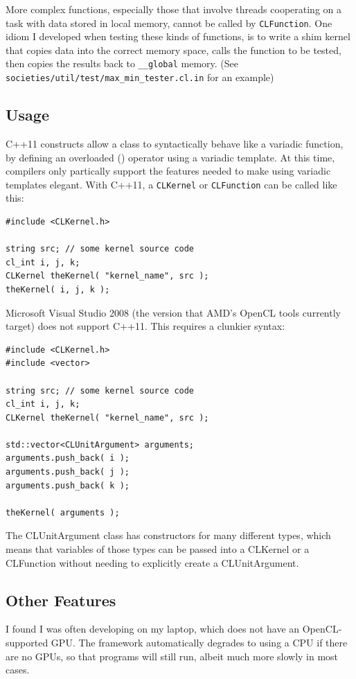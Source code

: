 \documentclass{article}
\begin{document}
More complex functions, especially those that involve threads cooperating on a task with data stored in local memory, cannot be called by \texttt{CLFunction}. One idiom I developed when testing these kinds of functions, is to write a shim kernel that copies data into the correct memory space, calls the function to be tested, then copies the results back to \texttt{\_\_global} memory. (See \texttt{societies/util/test/max\_min\_tester.cl.in} for an example)

\subsection{Usage}
C++11 constructs allow a class to syntactically behave like a variadic function, by defining an overloaded () operator using a variadic template. At this time, compilers only partically support the features needed to make using variadic templates elegant. With C++11, a \texttt{CLKernel} or \texttt{CLFunction} can be called like this:

\begin{lstlisting}
#include <CLKernel.h>

string src; // some kernel source code
cl_int i, j, k;
CLKernel theKernel( "kernel_name", src );
theKernel( i, j, k );
\end{lstlisting}

Microsoft Visual Studio 2008 (the version that AMD's OpenCL tools currently target) does not support C++11. This requires a clunkier syntax:

\begin{lstlisting}
#include <CLKernel.h>
#include <vector>

string src; // some kernel source code
cl_int i, j, k;
CLKernel theKernel( "kernel_name", src );

std::vector<CLUnitArgument> arguments;
arguments.push_back( i ); 
arguments.push_back( j ); 
arguments.push_back( k ); 

theKernel( arguments );
\end{lstlisting}

The CLUnitArgument class has constructors for many different types, which means that variables of those types can be passed into a CLKernel or a CLFunction without needing to explicitly create a CLUnitArgument.

\subsection{Other Features}
I found I was often developing on my laptop, which does not have an OpenCL-supported GPU. The framework automatically degrades to using a CPU if there are no GPUs, so that programs will still run, albeit much more slowly in most cases.
\end{document}
